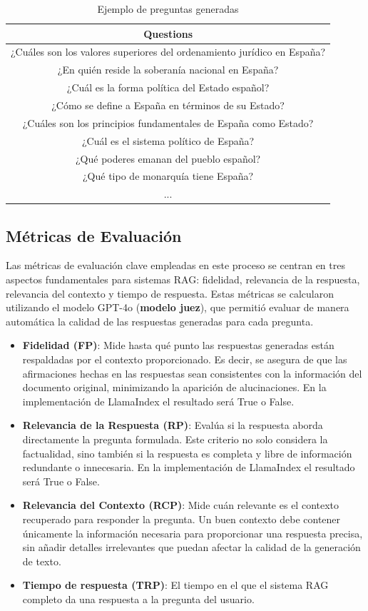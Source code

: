 \begin{table}[h]
\centering
\begin{tabular}{|c|}
\hline
\textbf{Questions} \\ \hline
¿Cuáles son los valores superiores del ordenamiento jurídico en España? \\ \hline
¿En quién reside la soberanía nacional en España? \\ \hline
¿Cuál es la forma política del Estado español? \\ \hline
¿Cómo se define a España en términos de su Estado? \\ \hline
¿Cuáles son los principios fundamentales de España como Estado? \\ \hline
¿Cuál es el sistema político de España? \\ \hline
¿Qué poderes emanan del pueblo español? \\ \hline
¿Qué tipo de monarquía tiene España? \\ \hline
... \\ \hline
\end{tabular}
\caption{Ejemplo de preguntas generadas}
\label{tab:questions}
\end{table}


\subsection{Métricas de Evaluación}

Las métricas de evaluación clave empleadas en este proceso se centran en tres aspectos fundamentales para sistemas RAG: fidelidad, relevancia de la respuesta, relevancia del contexto y tiempo de respuesta. Estas métricas se calcularon utilizando el modelo GPT-4o (\textbf{modelo juez}), que permitió evaluar de manera automática la calidad de las respuestas generadas para cada pregunta.

\begin{itemize}
    \item \textbf{Fidelidad (FP)}: Mide hasta qué punto las respuestas generadas están respaldadas por el contexto proporcionado. Es decir, se asegura de que las afirmaciones hechas en las respuestas sean consistentes con la información del documento original, minimizando la aparición de alucinaciones. En la implementación de LlamaIndex el resultado será True o False.
    \item \textbf{Relevancia de la Respuesta (RP)}: Evalúa si la respuesta aborda directamente la pregunta formulada. Este criterio no solo considera la factualidad, sino también si la respuesta es completa y libre de información redundante o innecesaria. En la implementación de LlamaIndex el resultado será True o False.
    \item \textbf{Relevancia del Contexto (RCP)}: Mide cuán relevante es el contexto recuperado para responder la pregunta. Un buen contexto debe contener únicamente la información necesaria para proporcionar una respuesta precisa, sin añadir detalles irrelevantes que puedan afectar la calidad de la generación de texto.
    \item \textbf{Tiempo de respuesta (TRP)}: El tiempo en el que el sistema RAG completo da una respuesta a la pregunta del usuario.
\end{itemize}

